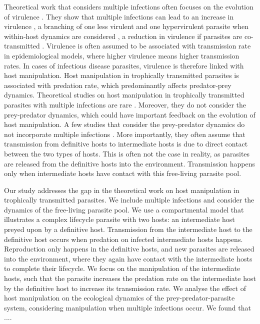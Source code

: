 \documentclass[11pt]{article}
\begin{document}
Theoretical work that considers multiple infections often focuses on the evolution of virulence \cite{vanBaalen1995, Alizon2013, Alizon2008, Choisy2010, Alizon2012}. 
They show that multiple infections can lead to an increase in virulence \cite{vanBaalen1995, Choisy2010}, a branching of one less virulent and one hypervirulent parasite when within-host dynamics are considered \cite{ Alizon2008}, a reduction in virulence if parasites are co-transmitted \cite{Alizon2012}. Virulence is often assumed to be associated with transmission rate in epidemiological models, where higher virulence means higher transmission rates. In cases of infectious disease parasites, virulence is therefore linked with host manipulation. 
Host manipulation in trophically transmitted parasites is associated with predation rate, which predominantly affects predator-prey dynamics. 
Theoretical studies on host manipulation in trophically transmitted parasites with multiple infections are rare \cite{Parker2003,Vickery2009}. Moreover, they do not consider the prey-predator dynamics, which could have important feedback on the evolution of host manipulation. 
A few studies that consider the prey-predator dynamics do not incorporate multiple infections \cite{Rogawa2018, Iritani2018, Hadeler1989, Fenton2006}. 
More importantly, they often assume that transmission from definitive hosts to intermediate hosts is due to direct contact between the two types of hosts. 
This is often not the case in reality, as parasites are released from the definitive hosts into the environment. 
Transmission happens only when intermediate hosts have contact with this free-living parasite pool.


Our study addresses the gap in the theoretical work on host manipulation in trophically transmitted parasites.
We include multiple infections and consider the dynamics of the free-living parasite pool. 
We use a compartmental model that illustrates a complex lifecycle parasite with two hosts: an intermediate host preyed upon by a definitive host. 
Transmission from the intermediate host to the definitive host occurs when predation on infected intermediate hosts happens. 
Reproduction only happens in the definitive hosts, and new parasites are released into the environment, where they again have contact with the intermediate hosts to complete their lifecycle. 
We focus on the manipulation of the intermediate hosts, such that the parasite increases the predation rate on the intermediate host by the definitive host to increase its transmission rate. 
We analyse the effect of host manipulation on the ecological dynamics of the prey-predator-parasite system, considering manipulation when multiple infections occur. We found that ....
\end{document}
